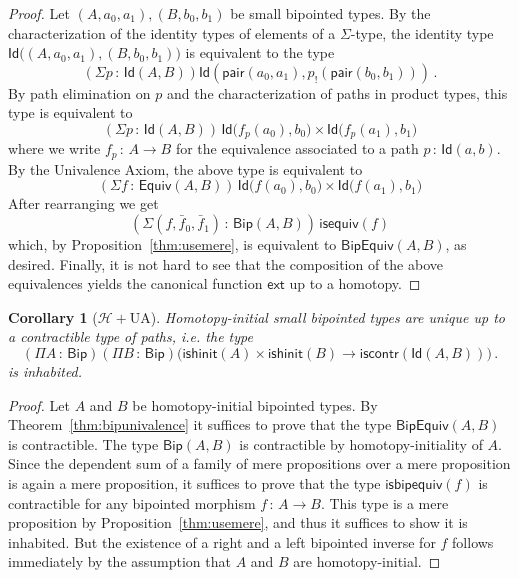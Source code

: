 \documentclass[10pt,a4paper,oneside,reqno]{amsart}
\theoremstyle{mythm}
\newtheorem{corollary}[theorem]{Corollary}
\theoremstyle{mydef}
\theoremstyle{myrmk}
\newcommand{\co}{\,{:}\,}
\newcommand{\Hint}{\mathcal{H}}
\newcommand{\iscontr}{\mathsf{iscontr}}
\newcommand{\isequiv}{\mathsf{isequiv}}
\newcommand{\isbiphinit}{\mathsf{ishinit}}
\newcommand{\ext}{\mathsf{ext}}
\newcommand{\Id}{\mathsf{Id}}
\newcommand{\pair}{\mathsf{pair}}
\newcommand{\Bip}{\mathsf{Bip}}
\newcommand{\BipHom}{\mathsf{Bip}}
\newcommand{\isbipequiv}{\mathsf{isbipequiv}}
\newcommand{\BipEquiv}{\mathsf{BipEquiv}}
\begin{document}
\begin{proof} 
Let $ (A,a_0,a_1), (B,b_0,b_1)$ be small bipointed types. By the characterization of the identity types
of  elements of a $\Sigma$-type, the 
identity type $\Id\big( (A,a_0,a_1),  (B,b_0,b_1)\big)$ is equivalent to  the type
\[
(\Sigma p \co \Id(A,B))  \Id(\pair(a_0,a_1),  p_{!}(\pair(b_0,b_1))) \, .
\]
By path elimination on $p$ and the characterization of paths in product types, this type is equivalent to
\[ 
(\Sigma p \co \Id(A,B)) \, \Id \big( f_p(a_0),  b_0\big) \times \Id \big( f_p(a_1) , b_1)
 \]
where we write $f_p \co A \to B$ for the equivalence associated to a path $p \co \Id(a,b)$.  By the Univalence Axiom,
the above type is equivalent to
\[ 
(\Sigma f \co \mathsf{Equiv}(A,B)) \, \Id \big( f(a_0),  b_0\big) \times \Id \big( f(a_1) , b_1\big) \]
After rearranging we get
\[
(\Sigma (f, \bar{f}_0, \bar{f}_1) \co \BipHom(A,B)) \, \isequiv(f)
\]
which, by Proposition~\ref{thm:usemere}, is equivalent to $\BipEquiv(A,B)$, as desired. Finally, it is not hard to see that the composition of the above equivalences yields the canonical function $\ext$ up to a homotopy.
\end{proof} 

\begin{corollary}[$\Hint + \mathrm{UA}$] \label{BoolHInitIso} 
Homotopy-initial small bipointed types are unique up to a contractible type of paths, i.e. the type
\[ 
(\Pi A \co \Bip) (\Pi B \co \Bip)
\big( \isbiphinit(A) \times \isbiphinit(B) \to \iscontr(\Id(A,B)) \big) \, .
\] 
is inhabited.
\end{corollary}

\begin{proof} Let $A$ and $B$ be homotopy-initial bipointed types. 
By Theorem~\ref{thm:bipunivalence} it suffices to prove that the type $\BipEquiv(A,B)$ is contractible. The type 
$\BipHom( A, B)$ is contractible by homotopy-initiality of $A$. Since the dependent sum of a family of mere propositions over a mere proposition is again a mere proposition, it suffices to prove that the type $\isbipequiv(f)$ is contractible for any bipointed morphism $f \co A \to B$. This type is a mere proposition by 
Proposition~\ref{thm:usemere}, and thus it suffices to show it is inhabited. But the existence of a right and a left bipointed inverse for $f$ follows immediately
by the assumption that $A$ and $B$ are homotopy-initial.
\end{proof}

\end{document}
